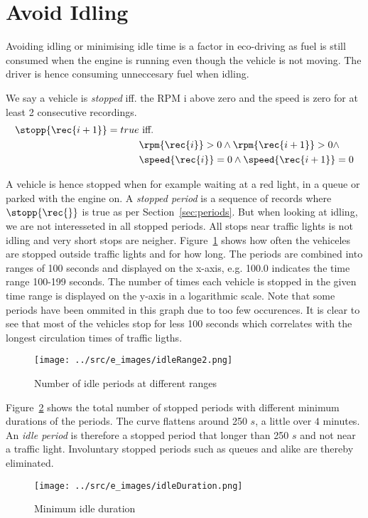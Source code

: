 \section{Avoid Idling}\label{sec:idle}


Avoiding idling or minimising idle time is a factor in eco-driving as fuel is still consumed when the engine is running even though the vehicle is not moving.
The driver is hence consuming unneccesary fuel when idling.

We say a vehicle is \textit{stopped} iff. the RPM i above zero and the speed is zero for at least 2 consecutive recordings.
\begin{align}
\stopp{\rec{i+1}} = true &\mbox{ iff. } \nonumber\\
&\rpm{\rec{i}} > 0 \wedge \rpm{\rec{i+1}} > 0 \wedge \nonumber\\
&\speed{\rec{i}} = 0 \wedge \speed{\rec{i+1}} = 0 \nonumber
\end{align}

A vehicle is hence stopped when for example waiting at a red light, in a queue or parked with the engine on. 
A \textit{stopped period} is a sequence of records where $\stopp{\rec{}}$ is true as per Section~\ref{sec:periods}.
But when looking at idling, we are not interesseted in all stopped periods.
All stops near traffic lights is not idling and very short stops are neigher.  
Figure~\ref{fig:idleRange2} shows how often the vehiceles are stopped outside traffic lights and for how long. 
The periods are combined into ranges of 100 seconds and displayed on the x-axis, e.g. 100.0 indicates the time range 100-199 seconds. 
The number of times each vehicle is stopped in the given time range is displayed on the y-axis in a logarithmic scale.
Note that some periods have been ommited in this graph due to too few occurences.
It is clear to see that most of the vehicles stop for less 100 seconds which correlates with the longest circulation times of traffic ligths. 

\begin{figure}[htb]
\centering
\texttt{[image: ../src/e\_images/idleRange2.png]}
\caption{Number of idle periods at different ranges}
\label{fig:idleRange2}
\end{figure}

Figure~\ref{fig:idleDuration} shows the total number of stopped periods with different minimum durations of the periods.
The curve flattens around 250 $s$, a little over $4$ minutes.
An \textit{idle period} is therefore a stopped period that longer than 250 $s$ and not near a traffic light.
Involuntary stopped periods such as queues and alike are thereby eliminated.
\begin{figure}[htb]
\centering
\texttt{[image: ../src/e\_images/idleDuration.png]}
\caption{Minimum idle duration}
\label{fig:idleDuration}
\end{figure}

